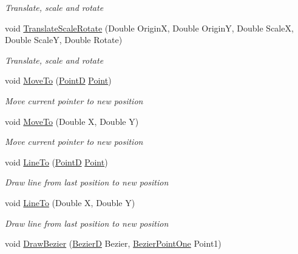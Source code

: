\begin{DoxyCompactItemize}
\begin{DoxyCompactList}\small\item\em Translate, scale and rotate \end{DoxyCompactList}\item 
void \hyperlink{class_pdf_file_writer_1_1_pdf_contents_aafe68410fef0983edbfb69e419d302c6}{Translate\+Scale\+Rotate} (Double OriginX, Double OriginY, Double ScaleX, Double ScaleY, Double Rotate)
\begin{DoxyCompactList}\small\item\em Translate, scale and rotate \end{DoxyCompactList}\item 
void \hyperlink{class_pdf_file_writer_1_1_pdf_contents_ae9c7713bb3ea40a6ca2c37d62a47d994}{Move\+To} (\hyperlink{class_pdf_file_writer_1_1_point_d}{PointD} \hyperlink{namespace_pdf_file_writer_adf167276d483eb5d597fed4e3297ba17a2a3cd5946cfd317eb99c3d32e35e2d4c}{Point})
\begin{DoxyCompactList}\small\item\em Move current pointer to new position \end{DoxyCompactList}\item 
void \hyperlink{class_pdf_file_writer_1_1_pdf_contents_ad23469e941c46e6b4270ded0e1de7a14}{Move\+To} (Double X, Double Y)
\begin{DoxyCompactList}\small\item\em Move current pointer to new position \end{DoxyCompactList}\item 
void \hyperlink{class_pdf_file_writer_1_1_pdf_contents_ab08e442266e761397ceeee2247aea211}{Line\+To} (\hyperlink{class_pdf_file_writer_1_1_point_d}{PointD} \hyperlink{namespace_pdf_file_writer_adf167276d483eb5d597fed4e3297ba17a2a3cd5946cfd317eb99c3d32e35e2d4c}{Point})
\begin{DoxyCompactList}\small\item\em Draw line from last position to new position \end{DoxyCompactList}\item 
void \hyperlink{class_pdf_file_writer_1_1_pdf_contents_a2240ccf43fabf86cc8e2bf3b6ee3d303}{Line\+To} (Double X, Double Y)
\begin{DoxyCompactList}\small\item\em Draw line from last position to new position \end{DoxyCompactList}\item 
void \hyperlink{class_pdf_file_writer_1_1_pdf_contents_a982c6202510e7759cd530657a204c53a}{Draw\+Bezier} (\hyperlink{class_pdf_file_writer_1_1_bezier_d}{BezierD} Bezier, \hyperlink{namespace_pdf_file_writer_a12a19c6c1faeda33d34ad5a36130b1bf}{Bezier\+Point\+One} Point1)

\end{DoxyCompactItemize}
